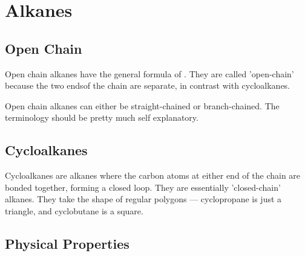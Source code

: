 


\pagebreak
\section{Alkanes}

\subsection{Open Chain}

	Open chain alkanes have the general formula of . They are called 'open-chain' because
	the two endsof the chain are separate, in contrast with cycloalkanes.

	Open chain alkanes can either be straight-chained or branch-chained. The terminology should be pretty much
	self explanatory.





\subsection{Cycloalkanes}

	Cycloalkanes are alkanes where the carbon atoms at either end of the chain are bonded together, forming a closed loop.
	They are essentially 'closed-chain' alkanes. They take the shape of regular polygons –– cyclopropane is just a triangle,
	and cyclobutane is a square.





\subsection{Physical Properties}
